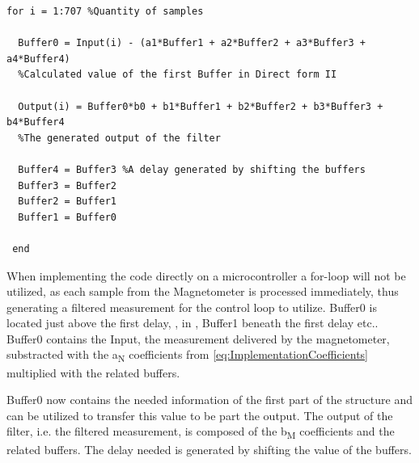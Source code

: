 \begin{lstlisting}
for i = 1:707 %Quantity of samples

  Buffer0 = Input(i) - (a1*Buffer1 + a2*Buffer2 + a3*Buffer3 + a4*Buffer4) 
  %Calculated value of the first Buffer in Direct form II
	
  Output(i) = Buffer0*b0 + b1*Buffer1 + b2*Buffer2 + b3*Buffer3 + b4*Buffer4 
  %The generated output of the filter
    	
  Buffer4 = Buffer3	%A delay generated by shifting the buffers
  Buffer3 = Buffer2
  Buffer2 = Buffer1
  Buffer1 = Buffer0
    
 end
\end{lstlisting}

When implementing the code directly on a microcontroller a for-loop will not be utilized, as each sample from the Magnetometer is processed immediately, thus generating a filtered measurement for the control loop to utilize.
Buffer0 is located just above the first delay, \si{}, in , Buffer1 beneath the first delay etc.. Buffer0 contains the Input, the measurement delivered by the magnetometer, substracted with the \si{a_N} coefficients from \eqref{eq:ImplementationCoefficients} multiplied with the related buffers.

Buffer0 now contains the needed information of the first part of the structure and can be utilized to transfer this value to be part the output. The output of the filter, i.e. the filtered measurement, is composed of the \si{b_M} coefficients and the related buffers. The delay needed is generated by shifting the value of the buffers.

